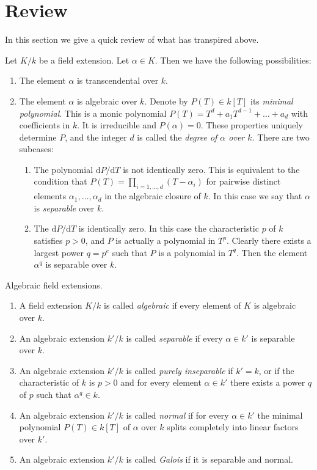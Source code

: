\section{Review}
\label{section-algebraic}

\noindent
In this section we give a quick review of what has transpired above.

\medskip\noindent
Let $K/k$ be a field extension. Let $\alpha \in K$. Then we have the
following possibilities:
\begin{enumerate}
\item The element $\alpha$ is transcendental over $k$.
\item The element $\alpha$ is algebraic over $k$. Denote by
$P(T) \in k[T]$ its {\it minimal polynomial}. This is a monic polynomial
$P(T) = T^d + a_1 T^{d - 1} + \ldots + a_d$ with coefficients in
$k$. It is irreducible and $P(\alpha) = 0$. These properties
uniquely determine $P$, and the integer $d$ is called the
{\it degree of $\alpha$ over $k$}. There are two subcases:
\begin{enumerate}
\item The polynomial $\text{d}P/\text{d}T$ is not identically zero.
This is equivalent to the condition that
$P(T) = \prod_{i = 1, \ldots, d} (T - \alpha_i)$ for
pairwise distinct elements $\alpha_1, \ldots, \alpha_d$
in the algebraic closure of $k$.
In this case we say that $\alpha$ is {\it separable} over $k$.
\item The $\text{d}P/\text{d}T$ is identically zero. In this case the
characteristic $p$ of $k$ satisfies $p > 0$, and $P$ is actually a polynomial
in $T^p$. Clearly there exists a largest power $q = p^e$ such that $P$ is
a polynomial in $T^q$. Then the element $\alpha^q$ is separable over $k$.
\end{enumerate}
\end{enumerate}

\begin{definition}
\label{definition-separable-algebraic}
Algebraic field extensions.
\begin{enumerate}
\item A field extension $K/k$ is called {\it algebraic}
if every element of $K$ is algebraic over $k$.
\item An algebraic extension $k'/k$ is called {\it separable}
if every $\alpha \in k'$ is separable over $k$.
\item An algebraic
extension $k'/k$ is called {\it purely inseparable} if $k'=k$, or if
the characteristic of $k$ is $p > 0$ and for every element
$\alpha \in k'$ there exists a power $q$ of $p$ such that
$\alpha^q \in k$.
\item An algebraic extension $k'/k$ is called {\it normal}
if for every $\alpha \in k'$ the minimal polynomial $P(T) \in k[T]$
of $\alpha$ over $k$ splits completely into linear factors over $k'$.
\item An algebraic extension $k'/k$ is called {\it Galois}
if it is separable and normal.
\end{enumerate}
\end{definition}

